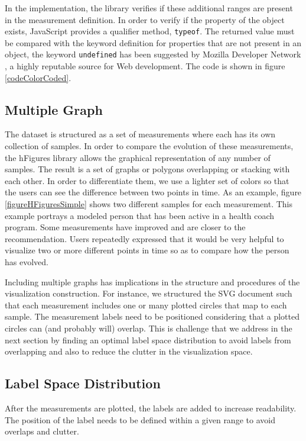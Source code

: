 \documentclass[twocolumn]{bmcart}%
\begin{document}
In the implementation, the library verifies if these additional ranges are present in the measurement definition. In order to verify if the property of the object exists, JavaScript provides a qualifier method, \texttt{typeof}. The returned value must be compared with the keyword definition for properties that are not present in an object, the keyword \texttt{undefined} has been suggested by Mozilla Developer Network \cite{MDNJS}, a highly reputable source for Web development. The code is shown in figure \ref{codeColorCoded}.

\subsection*{Multiple Graph}

The dataset is structured as a set of measurements where each has its own collection of samples. In order to compare the evolution of these measurements, the hFigures library allows the graphical representation of any number of samples. The result is a set of graphs or polygons overlapping or stacking with each other. In order to differentiate them, we use a lighter set of colors so that the users can see the difference between two points in time. As an example, figure \ref{figureHFiguresSimple} shows two different samples for each measurement. This example portrays a modeled person that has been active in a health coach program. Some measurements have improved and are closer to the recommendation. Users repeatedly expressed that it would be very helpful to visualize two or more different points in time so as to compare how the person has evolved. 

Including multiple graphs has implications in the structure and procedures of the visualization construction. For instance, we structured the SVG document such that each measurement includes one or many plotted circles that map to each sample. The measurement labels need to be positioned considering that a plotted circles can (and probably will) overlap. This is challenge that we address in the next section by finding an optimal label space distribution to avoid labels from overlapping and also to reduce the clutter in the visualization space.

\subsection*{Label Space Distribution}

After the measurements are plotted, the labels are added to increase readability. The position of the label needs to be defined within a given range to avoid overlaps and clutter.
\end{document}
